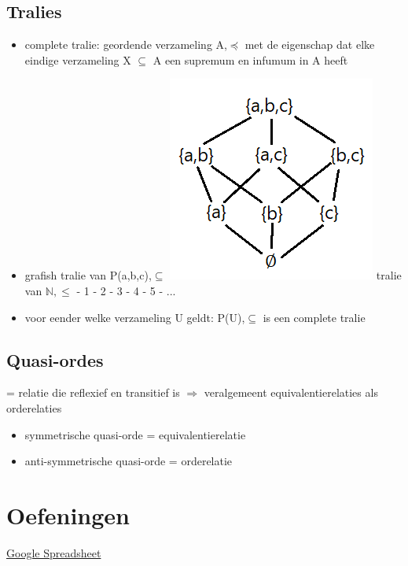 \documentclass{article}
\begin{document}
\subsection{Tralies}
\begin{itemize}
    \item complete tralie: geordende verzameling A,$\preceq$ met de eigenschap dat elke eindige verzameling X $\subseteq$ A een supremum en infumum in A heeft
    \item grafish \newline tralie van P({a,b,c}),$\subseteq$ \newline \includegraphics{tralie} \newline
    tralie van $\mathbb{N} ,\leq$
    \newline {} - 1 - 2 - 3 - 4 - 5 - ...
    \item voor eender welke verzameling U geldt: P(U),$\subseteq$ is een complete tralie
\end{itemize}
\subsection{Quasi-ordes}
= relatie die reflexief en transitief is
$\Rightarrow$ veralgemeent equivalentierelaties als orderelaties
\begin{itemize}
    \item symmetrische quasi-orde = equivalentierelatie
    \item anti-symmetrische quasi-orde = orderelatie
\end{itemize}

\section{Oefeningen}
\href{https://docs.google.com/spreadsheets/d/1thtWaGEHPFeVuYDWK-XKuEimLSO2Zc_yDwdODAbYIok/edit#gid=0}{Google Spreadsheet}
\end{document}

